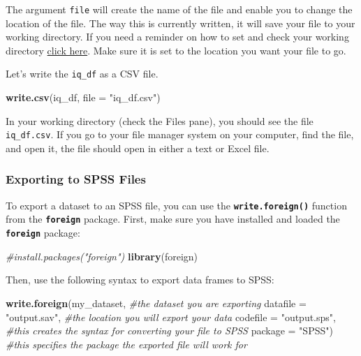 \documentclass[
]{book}
\newenvironment{Shaded}{\begin{snugshade}}{\end{snugshade}}
\newcommand{\AttributeTok}[1]{\textcolor[rgb]{0.13,0.29,0.53}{#1}}
\newcommand{\CommentTok}[1]{\textcolor[rgb]{0.56,0.35,0.01}{\textit{#1}}}
\newcommand{\FunctionTok}[1]{\textcolor[rgb]{0.13,0.29,0.53}{\textbf{#1}}}
\newcommand{\NormalTok}[1]{#1}
\newcommand{\StringTok}[1]{\textcolor[rgb]{0.31,0.60,0.02}{#1}}
\begin{document}
The argument \texttt{file} will create the name of the file and enable you to change the location of the file. The way this is currently written, it will save your file to your working directory. If you need a reminder on how to set and check your working directory \protect\hyperlink{set_wd}{click here}. Make sure it is set to the location you want your file to go.

Let's write the \texttt{iq\_df} as a CSV file.

\begin{Shaded}
\begin{Highlighting}[]
\FunctionTok{write.csv}\NormalTok{(iq\_df, }\AttributeTok{file =} \StringTok{"iq\_df.csv"}\NormalTok{)}
\end{Highlighting}
\end{Shaded}

In your working directory (check the Files pane), you should see the file \texttt{iq\_df.csv}. If you go to your file manager system on your computer, find the file, and open it, the file should open in either a text or Excel file.

\hypertarget{exporting-to-spss-files}{%
\subsubsection{Exporting to SPSS Files}\label{exporting-to-spss-files}}

To export a dataset to an SPSS file, you can use the \textbf{\texttt{write.foreign()}} function from the \textbf{\texttt{foreign}} package. First, make sure you have installed and loaded the \textbf{\texttt{foreign}} package:

\begin{Shaded}
\begin{Highlighting}[]
\CommentTok{\#install.packages("foreign")}
\FunctionTok{library}\NormalTok{(foreign)}
\end{Highlighting}
\end{Shaded}

Then, use the following syntax to export data frames to SPSS:

\begin{Shaded}
\begin{Highlighting}[]
\FunctionTok{write.foreign}\NormalTok{(my\_dataset, }\CommentTok{\#the dataset you are exporting}
              \AttributeTok{datafile =} \StringTok{"output.sav"}\NormalTok{, }\CommentTok{\#the location you will export your data}
              \AttributeTok{codefile =} \StringTok{"output.sps"}\NormalTok{, }\CommentTok{\#this creates the syntax for converting your file to SPSS}
              \AttributeTok{package =} \StringTok{"SPSS"}\NormalTok{) }\CommentTok{\#this specifies the package the exported file will work for}
\end{Highlighting}
\end{Shaded}
\end{document}

